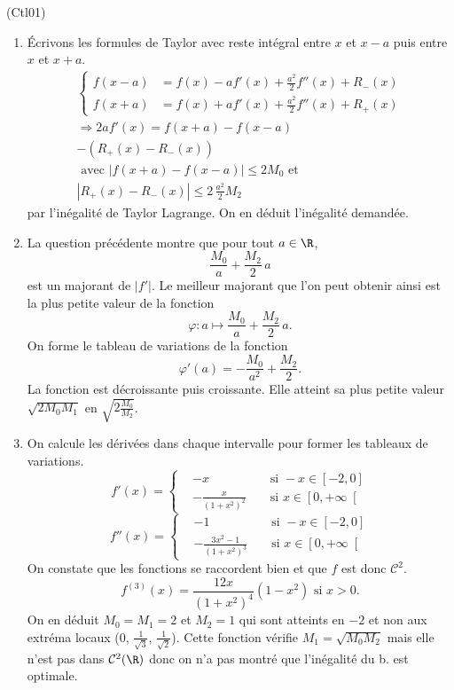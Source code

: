 \begin{tiny}(Ctl01)\end{tiny}
\begin{enumerate}
  \item \'Ecrivons les formules de Taylor avec reste intégral entre $x$ et $x-a$ puis entre $x$ et $x+a$.
\begin{multline*}
\left\lbrace
  \begin{aligned}
f(x-a) &= f(x) - af'(x) + \frac{a^2}{2}f''(x) + R_-(x) \\ 
f(x+a) &= f(x) + af'(x) + \frac{a^2}{2}f''(x) + R_+(x)
  \end{aligned}
\right. \\
\Rightarrow 
2af'(x) = f(x+a) - f(x-a) \\
-\left(R_+(x) - R_-(x)\right)\\
\text{ avec } \left| f(x+a) - f(x-a)\right| \leq 2 M_0 
\text{ et }\\
\left|R_+(x) - R_-(x)\right| \leq 2 \, \frac{a^2}{2}M_2
\end{multline*}
par l'inégalité de Taylor Lagrange. On en déduit l'inégalité demandée.

  \item La question précédente montre que pour tout $a \in \R$, 
\[
  \frac{M_0}{a} + \frac{M_2}{2}\, a
\]
est un majorant de $|f'|$. Le meilleur majorant que l'on peut obtenir ainsi est la plus petite valeur de la fonction
\[
  \varphi : a \mapsto \frac{M_0}{a} + \frac{M_2}{2}\, a.
\]
On forme le tableau de variations de la fonction
\[
  \varphi'(a) = -\frac{M_0}{a^2} + \frac{M_2}{2}.
\]
La fonction est décroissante puis croissante. Elle atteint sa plus petite valeur $\sqrt{2 M_0 M_1}$ en $\sqrt{2\frac{M_0} {M_2}}$.

  \item On calcule les dérivées dans chaque intervalle pour former les tableaux de variations.
\[
  f'(x) = 
  \left\lbrace
  \begin{aligned}
   & -x &&\text{ si } -x \in \left[-2,0\right] \\
   & -\frac{x}{(1+x^2)^2} &&\text{ si } x \in \left[0, +\infty\right[ 
  \end{aligned}
\right.
\]
\[
  f''(x) = 
  \left\lbrace
  \begin{aligned}
   & -1 &&\text{ si } -x \in \left[-2,0\right] \\
   & -\frac{3x^2-1}{(1+x^2)^3} &&\text{ si } x \in \left[0, +\infty\right[ 
  \end{aligned}
\right.
\]
On constate que les fonctions se raccordent bien et que $f$ est donc $\mathcal{C}^2$.
\[
  f^{(3)}(x) = \frac{12x}{(1+x^2)^4}(1-x^2)\text{ si } x>0.
\]
On en déduit $M_0 = M_1 = 2$ et $M_2=1$ qui sont atteints en $-2$ et non aux extréma locaux ($0$, $\frac{1}{\sqrt{3}}$, $\frac{1}{\sqrt{2}}$). Cette fonction vérifie $M_1 = \sqrt{M_0 M_2}$ mais elle n'est pas dans $\mathcal{C}^2(\R)$ donc on n'a pas montré que l'inégalité du b. est optimale. 
\end{enumerate}

